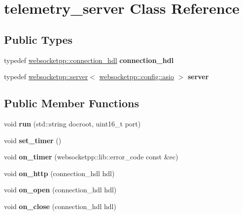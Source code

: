 \hypertarget{classtelemetry__server}{}\section{telemetry\+\_\+server Class Reference}
\label{classtelemetry__server}
\subsection*{Public Types}
\begin{DoxyCompactItemize}
\item 
\mbox{\label{classtelemetry__server_af7e7b04e711629c5af1cd03ccfdb0bee}} 
typedef \mbox{\hyperlink{namespacewebsocketpp_a6b3d26a10ee7229b84b776786332631d}{websocketpp\+::connection\+\_\+hdl}} {\bfseries connection\+\_\+hdl}
\item 
\mbox{\label{classtelemetry__server_a1663d7273586e751600999fd3af69d44}} 
typedef \mbox{\hyperlink{classwebsocketpp_1_1server}{websocketpp\+::server}}$<$ \mbox{\hyperlink{structwebsocketpp_1_1config_1_1asio}{websocketpp\+::config\+::asio}} $>$ {\bfseries server}
\end{DoxyCompactItemize}
\subsection*{Public Member Functions}
\begin{DoxyCompactItemize}
\item 
\mbox{\label{classtelemetry__server_a8c09eba40e8993079859e9f1974254ab}} 
void {\bfseries run} (std\+::string docroot, uint16\+\_\+t port)
\item 
\mbox{\label{classtelemetry__server_a2a510e3a3c91c123f37d95d7b7d140ea}} 
void {\bfseries set\+\_\+timer} ()
\item 
\mbox{\label{classtelemetry__server_acc29e40bd4262e42b3d16e4fcd79ec22}} 
void {\bfseries on\+\_\+timer} (websocketpp\+::lib\+::error\+\_\+code const \&ec)
\item 
\mbox{\label{classtelemetry__server_abab5c8572db5f87e745b862e59867bc8}} 
void {\bfseries on\+\_\+http} (connection\+\_\+hdl hdl)
\item 
\mbox{\label{classtelemetry__server_a3f0a1ba79c9d32843a4acca8a187bf17}} 
void {\bfseries on\+\_\+open} (connection\+\_\+hdl hdl)
\item 
\mbox{\label{classtelemetry__server_aab83aa8df38767bd2271dd775e6c3f0e}} 
void {\bfseries on\+\_\+close} (connection\+\_\+hdl hdl)
\end{DoxyCompactItemize}


